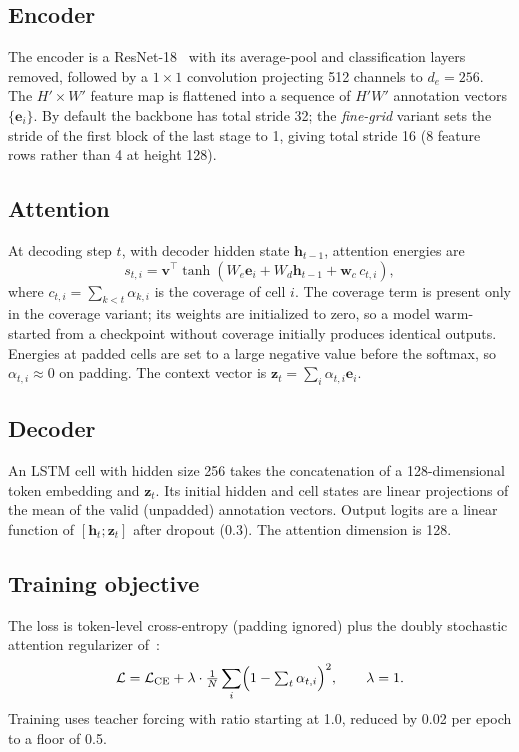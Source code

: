 \documentclass[conference]{IEEEtran}
\begin{document}
\subsection{Encoder}
The encoder is a ResNet-18~\cite{he2016resnet} with its average-pool and classification layers removed, followed by a $1{\times}1$ convolution projecting 512 channels to $d_e = 256$. The $H'{\times}W'$ feature map is flattened into a sequence of $H'W'$ annotation vectors $\{\mathbf{e}_i\}$. By default the backbone has total stride 32; the \emph{fine-grid} variant sets the stride of the first block of the last stage to 1, giving total stride 16 (8 feature rows rather than 4 at height 128).

\subsection{Attention}
At decoding step $t$, with decoder hidden state $\mathbf{h}_{t-1}$, attention energies are
\begin{equation}
s_{t,i} = \mathbf{v}^\top \tanh\!\left(W_e\mathbf{e}_i + W_d\mathbf{h}_{t-1} + \mathbf{w}_c\, c_{t,i}\right),
\end{equation}
where $c_{t,i}=\sum_{k<t}\alpha_{k,i}$ is the coverage of cell $i$. The coverage term is present only in the coverage variant; its weights are initialized to zero, so a model warm-started from a checkpoint without coverage initially produces identical outputs. Energies at padded cells are set to a large negative value before the softmax, so $\alpha_{t,i}\approx 0$ on padding. The context vector is $\mathbf{z}_t=\sum_i \alpha_{t,i}\mathbf{e}_i$.

\subsection{Decoder}
An LSTM cell with hidden size 256 takes the concatenation of a 128-dimensional token embedding and $\mathbf{z}_t$. Its initial hidden and cell states are linear projections of the mean of the valid (unpadded) annotation vectors. Output logits are a linear function of $[\mathbf{h}_t;\mathbf{z}_t]$ after dropout (0.3). The attention dimension is 128.

\subsection{Training objective}
The loss is token-level cross-entropy (padding ignored) plus the doubly stochastic attention regularizer of~\cite{xu2015show}:
\begin{equation}
\mathcal{L} = \mathcal{L}_{\mathrm{CE}} + \lambda \cdot \tfrac{1}{N}\sum_i \Bigl(1-\textstyle\sum_t \alpha_{t,i}\Bigr)^2, \qquad \lambda = 1.
\end{equation}
Training uses teacher forcing with ratio starting at 1.0, reduced by 0.02 per epoch to a floor of 0.5.
\end{document}
